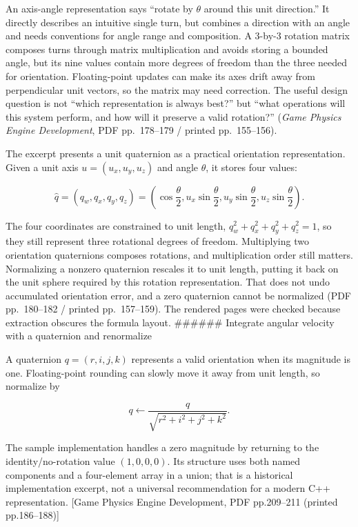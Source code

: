 An axis-angle representation says ``rotate by \(\theta\) around this unit direction.'' It directly describes an intuitive single turn, but combines a direction with an angle and needs conventions for angle range and composition. A 3-by-3 rotation matrix composes turns through matrix multiplication and avoids storing a bounded angle, but its nine values contain more degrees of freedom than the three needed for orientation. Floating-point updates can make its axes drift away from perpendicular unit vectors, so the matrix may need correction. The useful design question is not ``which representation is always best?'' but ``what operations will this system perform, and how will it preserve a valid rotation?'' (\emph{Game Physics Engine Development}, PDF pp.~178--179 / printed pp.~155--156).

The excerpt presents a unit quaternion as a practical orientation representation. Given a unit axis \(u=(u_x,u_y,u_z)\) and angle \(\theta\), it stores four values:

\[
\hat q = (q_w,q_x,q_y,q_z) = \left(\cos\frac{\theta}{2},
 u_x\sin\frac{\theta}{2},
 u_y\sin\frac{\theta}{2},
 u_z\sin\frac{\theta}{2}\right).
\]

The four coordinates are constrained to unit length, \(q_w^2+q_x^2+q_y^2+q_z^2=1\), so they still represent three rotational degrees of freedom. Multiplying two orientation quaternions composes rotations, and multiplication order still matters. Normalizing a nonzero quaternion rescales it to unit length, putting it back on the unit sphere required by this rotation representation. That does not undo accumulated orientation error, and a zero quaternion cannot be normalized (PDF pp.~180--182 / printed pp.~157--159). The rendered pages were checked because extraction obscures the formula layout. \#\#\#\#\#\# Integrate angular velocity with a quaternion and renormalize

A quaternion \(q=(r,i,j,k)\) represents a valid orientation when its magnitude is one. Floating-point rounding can slowly move it away from unit length, so normalize by

\[
q\leftarrow\frac{q}{\sqrt{r^2+i^2+j^2+k^2}}.
\]

The sample implementation handles a zero magnitude by returning to the identity/no-rotation value \((1,0,0,0)\). Its structure uses both named components and a four-element array in a union; that is a historical implementation excerpt, not a universal recommendation for a modern C++ representation. {[}Game Physics Engine Development, PDF pp.209--211 (printed pp.186--188){]}

